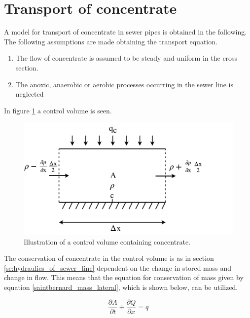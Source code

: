 \section{Transport of concentrate}\label{se:transport_of_concentrate}

A model for transport of concentrate in sewer pipes is obtained in the following.
The following assumptions are made obtaining the transport equation.

 \begin{table}[H]
\begin{enumerate}
	\item The flow of concentrate is assumed to be steady and uniform in the cross section.
	\item The anoxic, anaerobic or aerobic processes occurring in the sewer line is neglected   
\end{enumerate}
\label{tab:concentrate_flow}
\end{table}
 
In figure \ref{fig:poopvolume} a control volume is seen.
\begin{figure}[H]
\centering
\includegraphics[width=.8\textwidth]{report/modeling/pictures/poopvolume.pdf}
\caption{Illustration of a control volume containing concentrate.}
\label{fig:poopvolume}
\end{figure} 

The conservation of concentrate in the control volume is as in section \ref{se:hydraulics_of_sewer_line} dependent on the change in stored mass and change in flow. This means that the equation for conservation of mass given by equation \ref{saintbernard_mass_lateral}, which is shown below, can be utilized.

\begin{equation}	
\frac{\partial A}{\partial t} + \frac{\partial Q}{\partial x}=q
\label{eq:saintbernard_continuity_conflow}
\end{equation}


